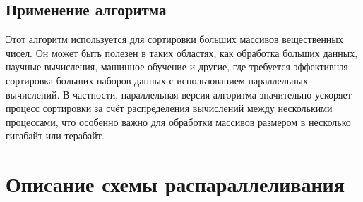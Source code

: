 \documentclass[12pt]{article}
\begin{document}
\subsection*{Применение алгоритма} Этот алгоритм используется для сортировки больших массивов вещественных чисел. Он может быть полезен в таких областях, как обработка больших данных, научные вычисления, машинное обучение и другие, где требуется эффективная сортировка больших наборов данных с использованием параллельных вычислений. В частности, параллельная версия алгоритма значительно ускоряет процесс сортировки за счёт распределения вычислений между несколькими процессами, что особенно важно для обработки массивов размером в несколько гигабайт или терабайт.

\newpage

\section*{Описание схемы распараллеливания}
\end{document}
